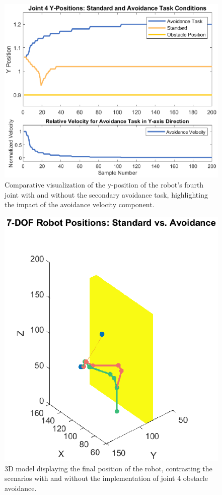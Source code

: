 \documentclass[a4paper]{article}
\begin{document}
\begin{figure}[htbp]
	\centering
	\includegraphics[width=1.0\linewidth]{Y-Positions.eps}
	\caption{Comparative visualization of the y-position of the robot's fourth joint with and without the secondary avoidance task, highlighting the impact of the avoidance velocity component.}
	\label{4 th joint plot}
\end{figure}

\begin{figure}[htbp]
	\centering
	\includegraphics[width=1.0\linewidth]{7-DOF_Robot_Positions_Standard_vs_Avoidance.eps}
	\caption{3D model displaying the final position of the robot, contrasting the scenarios with and without the implementation of joint 4 obstacle avoidance.}
	\label{3D model}
\end{figure}
	 	 
\end{document}
